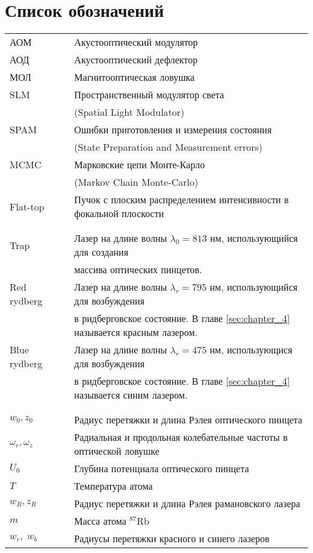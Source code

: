 

\section*{Список обозначений}

\begin{tabular}{lll}
	АОМ &    & Акустооптический модулятор \\
	АОД &    & Акустооптический дефлектор \\
	МОЛ &    & Магнитооптическая ловушка \\
	SLM &    & Пространственный модулятор света \\  
	& & (Spatial Light Modulator) \\
	SPAM &    & Ошибки приготовления и измерения состояния \\
	& & (State Preparation and Measurement errors) \\
	MCMC &    & Марковские цепи Монте-Карло \\
	& & (Markov Chain Monte-Carlo) \\
	Flat-top & & Пучок с плоским распределением интенсивности в фокальной плоскости \\
	& & \\
	& & \\
	Trap &     & Лазер на длине волны $\lambda_0 = 813 \text{ нм}$, использующийся для создания \\
	&   & массива оптических пинцетов. \\
	Red rydberg &    & Лазер на длине волны $\lambda_r = 795 \text{ нм}$, использующийся для возбуждения \\ 
	& & в ридберговское состояние. В главе \ref{sec:chapter_4} называется красным лазером.\\
	Blue rydberg &    & Лазер на длине волны $\lambda_r = 475 \text{ нм}$, использующися для возбуждения \\
	& & в ридберговское состояние. В главе \ref{sec:chapter_4} называется синим лазером.\\
	& & \\
	& & \\
	$w_0, z_0$ &    & Радиус перетяжки и длина Рэлея оптического пинцета \\
	$\omega_r, \omega_z$ &    & Радиальная и продольная колебательные частоты в оптической ловушке \\
	$U_0$ &    & Глубина потенциала оптического пинцета \\
	$T$ &    & Температура атома \\
	$w_{R}, z_{R}$ &    & Радиус перетяжки и длина Рэлея рамановского лазера \\
	$m$ &    & Масса атома $^{87}\text{Rb}$ \\
	$w_r, \; w_b$ &    & Радиусы перетяжки красного и синего лазеров
\end{tabular}




